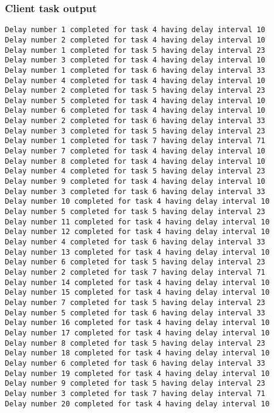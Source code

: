 \documentclass{article}
\begin{document}
\subsubsection{Client task output}
\begin{verbatim}
Delay number 1 completed for task 4 having delay interval 10
Delay number 2 completed for task 4 having delay interval 10
Delay number 1 completed for task 5 having delay interval 23
Delay number 3 completed for task 4 having delay interval 10
Delay number 1 completed for task 6 having delay interval 33
Delay number 4 completed for task 4 having delay interval 10
Delay number 2 completed for task 5 having delay interval 23
Delay number 5 completed for task 4 having delay interval 10
Delay number 6 completed for task 4 having delay interval 10
Delay number 2 completed for task 6 having delay interval 33
Delay number 3 completed for task 5 having delay interval 23
Delay number 1 completed for task 7 having delay interval 71
Delay number 7 completed for task 4 having delay interval 10
Delay number 8 completed for task 4 having delay interval 10
Delay number 4 completed for task 5 having delay interval 23
Delay number 9 completed for task 4 having delay interval 10
Delay number 3 completed for task 6 having delay interval 33
Delay number 10 completed for task 4 having delay interval 10
Delay number 5 completed for task 5 having delay interval 23
Delay number 11 completed for task 4 having delay interval 10
Delay number 12 completed for task 4 having delay interval 10
Delay number 4 completed for task 6 having delay interval 33
Delay number 13 completed for task 4 having delay interval 10
Delay number 6 completed for task 5 having delay interval 23
Delay number 2 completed for task 7 having delay interval 71
Delay number 14 completed for task 4 having delay interval 10
Delay number 15 completed for task 4 having delay interval 10
Delay number 7 completed for task 5 having delay interval 23
Delay number 5 completed for task 6 having delay interval 33
Delay number 16 completed for task 4 having delay interval 10
Delay number 17 completed for task 4 having delay interval 10
Delay number 8 completed for task 5 having delay interval 23
Delay number 18 completed for task 4 having delay interval 10
Delay number 6 completed for task 6 having delay interval 33
Delay number 19 completed for task 4 having delay interval 10
Delay number 9 completed for task 5 having delay interval 23
Delay number 3 completed for task 7 having delay interval 71
Delay number 20 completed for task 4 having delay interval 10
\end{verbatim}
\end{document}

